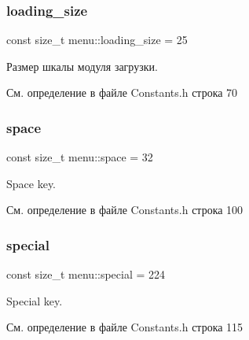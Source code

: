 \subsubsection{\texorpdfstring{loading\+\_\+size}{loading\_size}}
{\footnotesize\ttfamily const size\+\_\+t menu\+::loading\+\_\+size = 25}

Размер шкалы модуля загрузки. 

См. определение в файле Constants.\+h строка 70

\mbox{\label{namespacemenu_a480dcaab18029e9e82979360297d9841}} 
\subsubsection{\texorpdfstring{space}{space}}
{\footnotesize\ttfamily const size\+\_\+t menu\+::space = 32}

Space key. 

См. определение в файле Constants.\+h строка 100

\mbox{\label{namespacemenu_af11c563a29975fcfa8a0bac77b2630f7}} 
\subsubsection{\texorpdfstring{special}{special}}
{\footnotesize\ttfamily const size\+\_\+t menu\+::special = 224}

Special key. 

См. определение в файле Constants.\+h строка 115

